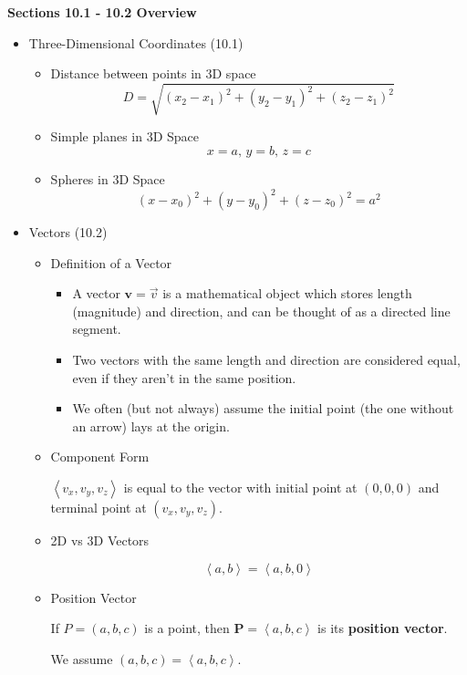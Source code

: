 \documentclass[12pt]{article}
\renewcommand{\vec}[1]{\mathbf{#1}}
\newcommand{\<}{\left<}
\renewcommand{\>}{\right>}
\begin{document}
\centerline{\bf Sections 10.1 - 10.2 Overview }

\begin{itemize}
\item Three-Dimensional Coordinates (10.1)

  \begin{itemize}
  \item Distance between points in 3D space
    \[D = \sqrt{(x_2 - x_1)^2 + (y_2 - y_1)^2 + (z_2 - z_1)^2}\]
    
  \item Simple planes in 3D Space
    \[x=a,\, y=b,\, z=c\]
  
  \item Spheres in 3D Space
    \[(x-x_0)^2 + (y-y_0)^2 + (z-z_0)^2 = a^2\]
  \end{itemize}

\item Vectors (10.2)
  \begin{itemize}
  \item Definition of a Vector
  
    \begin{itemize}
    \item A vector $\vec{v}=\overrightarrow{v}$ is a mathematical object which stores length (magnitude) and direction, and can be thought of as a directed line segment.
  
    \item Two vectors with the same length and direction are considered equal, even if they aren't in the same position. 

    \item We often (but not always) assume the initial point (the one without an arrow) lays at the origin.
    \end{itemize}
    
  \item Component Form
  
    $\<v_x,v_y,v_z\>$ is equal to the vector with initial point at $(0,0,0)$ and terminal point at $(v_x,v_y,v_z)$.
    
  \item 2D vs 3D Vectors
  
    \[\<a,b\>=\<a,b,0\>\]
    
  \item Position Vector
  
    If $P=(a,b,c)$ is a point, then $\vec{P}=\<a,b,c\>$ is its \textbf{position vector}. 

    We assume $(a,b,c)=\<a,b,c\>$.


\end{itemize}
\end{itemize}
\end{document}
